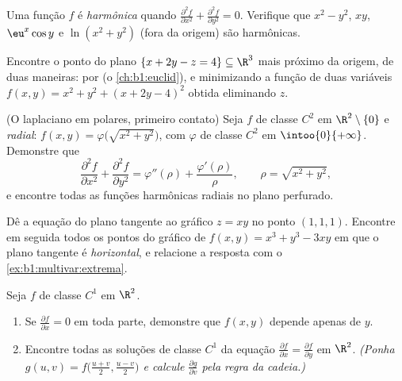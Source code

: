 \begin{exercise}[$\star\star$]\label{exo:b1:multivar:7}
Uma função $f$ é \emph{harmônica} quando $\frac{\partial^2 f}{\partial
x^2} + \frac{\partial^2 f}{\partial y^2} = 0$. Verifique que $x^2 -
y^2$,
$xy$, $\eu^x\cos y$ e $\ln(x^2 + y^2)$ (fora da origem) são harmônicas.
\end{exercise}

\begin{exercise}[$\star\star\star$]\label{exo:b1:multivar:8}
Encontre o ponto do plano $\{x + 2y - z = 4\} \subseteq \R^3$ mais próximo da origem, de duas
maneiras: por  (o \cref{ch:b1:euclid}), e minimizando a função de
duas variáveis $f(x, y) = x^2 + y^2 + (x + 2y - 4)^2$ obtida eliminando $z$.
\end{exercise}

\begin{exercise}[$\star\star\star$]\label{exo:b1:multivar:9}
(O laplaciano em  polares, primeiro contato) Seja $f$ de
classe $C^2$ em $\R^2 \setminus \{0\}$ e \emph{radial}: $f(x, y) =
\varphi\bigl(\sqrt{x^2+y^2}\bigr)$, com $\varphi$ de classe
$C^2$ em $\intoo{0}{+\infty}$. Demonstre que
\[
\frac{\partial^2 f}{\partial x^2} + \frac{\partial^2 f}{\partial
y^2} = \varphi''(\rho) + \frac{\varphi'(\rho)}{\rho},
\qquad \rho = \sqrt{x^2 + y^2},
\]
e encontre todas as funções harmônicas radiais no plano perfurado.
\end{exercise}

\begin{exercise}[$\star\star$]\label{exo:b1:multivar:10}
Dê a equação do plano tangente ao gráfico $z = xy$ no ponto $(1, 1, 1)$.
Encontre em seguida todos os pontos do gráfico de $f(x,y) = x^3 + y^3 - 3xy$ em que o plano
tangente é \emph{horizontal}, e relacione a resposta com o \cref{ex:b1:multivar:extrema}.
\end{exercise}

\begin{exercise}[$\star\star$]\label{exo:b1:multivar:11}
Seja $f$ de classe $C^1$ em $\R^2$.
\begin{enumerate}
  \item Se $\frac{\partial f}{\partial x} = 0$ em toda parte, demonstre que $f(x, y)$ depende
        apenas de $y$.
  \item Encontre todas as soluções de classe $C^1$ da equação $\frac{\partial f}{\partial x} = \frac{\partial
        f}{\partial y}$
        em $\R^2$. \emph{(Ponha $g(u, v) =
        f\bigl(\frac{u+v}2, \frac{u-v}2\bigr)$ e calcule $\frac{\partial g}{\partial v}$ pela regra da
        cadeia.)}
\end{enumerate}
\end{exercise}

